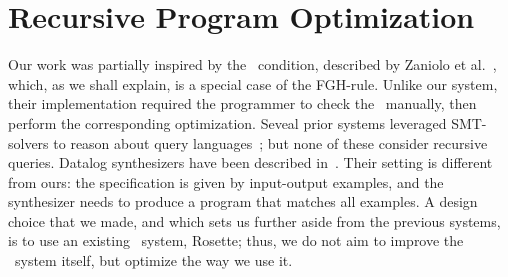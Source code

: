 
\section{Recursive Program Optimization}
\label{sec:related:recursion}

Our work was partially inspired by the \prem\
condition, described by Zaniolo et
al.~\cite{DBLP:journals/tplp/ZanioloYDSCI17}, which, as we shall
explain, is a special case of the FGH-rule.  Unlike our system, their
implementation required the programmer to check the \prem\ manually,
then perform the corresponding optimization.
%
Seveal prior systems  leveraged SMT-solvers to reason about
query languages~\cite{
  DBLP:conf/icfem/VeanesGHT09,
  DBLP:conf/cidr/ChuWWC17,
  DBLP:conf/cav/GrossmanCIRS17,
  DBLP:conf/sosp/SchlaipferRLS17,
  DBLP:journals/pacmpl/0001DLC18};
but none of these  consider recursive queries.
%
Datalog synthesizers have been described in~\cite{
  DBLP:conf/cp/AlbarghouthiKNS17,
  DBLP:conf/sigsoft/SiLZAKN18,
  DBLP:conf/ijcai/SiRHN19,
  DBLP:journals/pvldb/WangSCPD20,
  DBLP:journals/pacmpl/RaghothamanMZNS20}.
Their setting is different from ours:
the specification is given by input-output examples, and the
synthesizer needs to produce a program that matches all examples.
A design choice that we made, and which sets us further aside from the
previous systems, is to use an existing \cegis\ system, Rosette; thus,
we do not aim to  improve the \cegis\ system itself, but optimize the
way we use it.
